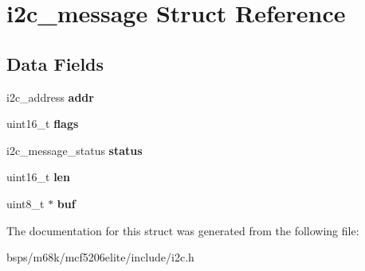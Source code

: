 \hypertarget{structi2c__message}{}\section{i2c\+\_\+message Struct Reference}
\label{structi2c__message}
\subsection*{Data Fields}
\begin{DoxyCompactItemize}
\item 
\mbox{\label{structi2c__message_afc9cd1c9a05ac39a90d1386e82438165}} 
i2c\+\_\+address {\bfseries addr}
\item 
\mbox{\label{structi2c__message_ab748d63fe521064af853e64fbfb7ee9d}} 
uint16\+\_\+t {\bfseries flags}
\item 
\mbox{\label{structi2c__message_ad34562e0a966e4cf2bbd967db32b35bf}} 
i2c\+\_\+message\+\_\+status {\bfseries status}
\item 
\mbox{\label{structi2c__message_ac80aaa534600c9edeb45adf394a243dd}} 
uint16\+\_\+t {\bfseries len}
\item 
\mbox{\label{structi2c__message_a517fed0f0e5bbe180effc937824489a0}} 
uint8\+\_\+t $\ast$ {\bfseries buf}
\end{DoxyCompactItemize}


The documentation for this struct was generated from the following file\+:\begin{DoxyCompactItemize}
\item 
bsps/m68k/mcf5206elite/include/i2c.\+h\end{DoxyCompactItemize}
